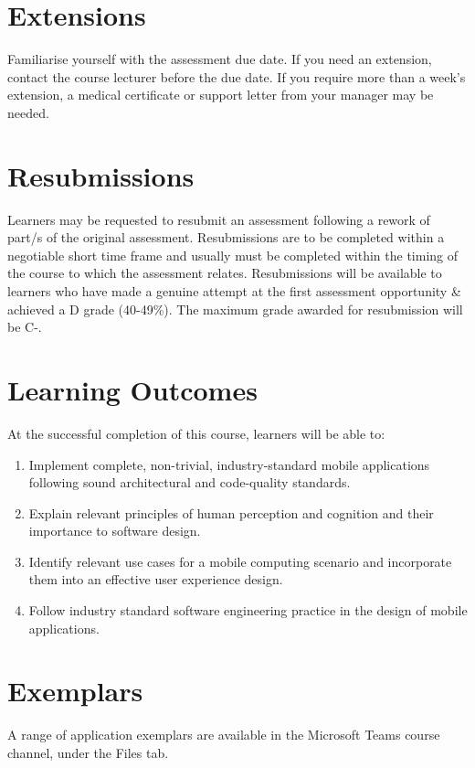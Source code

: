 \documentclass{article}
\begin{document}
\section*{Extensions}
Familiarise yourself with the assessment due date. If you need an extension, contact the course lecturer before the due date. If you require more than a week's extension, a medical certificate or support letter from your manager may be needed.

\section*{Resubmissions}
Learners may be requested to resubmit an assessment following a rework of part/s of the original assessment. Resubmissions are to be completed within a negotiable short time frame and usually must be completed within the timing of the course to which the assessment relates. Resubmissions will be available to learners who have made a genuine attempt at the first assessment opportunity \& achieved a D grade (40-49\%). The maximum grade awarded for resubmission will be C-.

\section*{Learning Outcomes}
At the successful completion of this course, learners will be able to:
\begin{enumerate}
    \item Implement complete, non-trivial, industry-standard mobile applications following sound architectural and code-quality standards.
    \item Explain relevant principles of human perception and cognition and their importance to software design.
    \item Identify relevant use cases for a mobile computing scenario and incorporate them into an effective user experience design.
    \item Follow industry standard software engineering practice in the design of mobile applications.
\end{enumerate}

\section*{Exemplars}
A range of application exemplars are available in the Microsoft Teams course channel, under the Files tab.

\newpage
\end{document}
